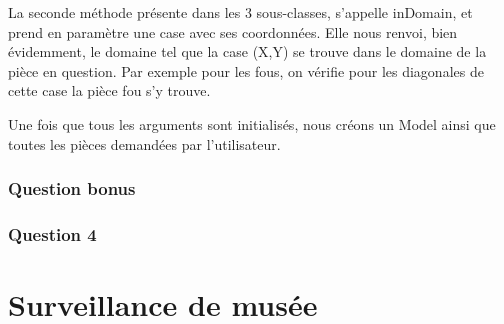 \documentclass{article}
\begin{document}
La seconde méthode présente dans les 3 sous-classes, s'appelle inDomain, et prend en paramètre une case avec ses coordonnées. Elle nous renvoi, bien évidemment, le domaine tel que la case (X,Y) se trouve dans le domaine de la pièce en question. Par exemple pour les fous, on vérifie pour les diagonales de cette case la pièce fou s'y trouve.


Une fois que tous les arguments sont initialisés, nous créons un Model ainsi que toutes les pièces demandées par l'utilisateur. 



\subsubsection{Question bonus}

\subsubsection{Question 4}

\section{Surveillance de musée}
\end{document}

